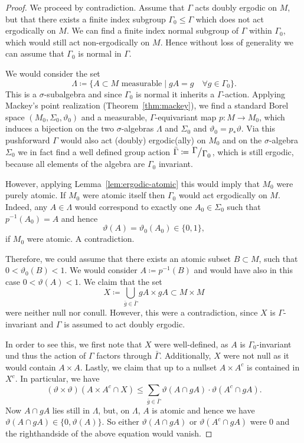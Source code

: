 \begin{proof}
  We proceed by contradiction. Assume that \(\Gamma\) acts doubly ergodic on \(M\), but that there exists a finite index subgroup \(\Gamma_0 \leq \Gamma\) which does not act ergodically on \(M\). We can find a finite index normal subgroup of \(\Gamma\) within \(\Gamma_0\), which would still act non-ergodically on \(M\). Hence without loss of generality we can assume that \(\Gamma_0\) is normal in \(\Gamma\).

  We would consider the set
  \[
    \Lambda \coloneqq \{A \subset M \text{ measurable} \mid gA = g \quad \forall g \in \Gamma_0\}.
  \]
  This is a \(\sigma\)-subalgebra and since \(\Gamma_0\) is normal it inherits a \(\Gamma\)-action. Applying Mackey's point realization (Theorem~\ref{thm:mackey}), we find a standard Borel space \((M_0, \Sigma_0, \vartheta_0)\) and a measurable, \(\Gamma\)-equivariant map \(p\colon M \to M_0\), which induces a bijection on the two \(\sigma\)-algebras \(\Lambda\) and \(\Sigma_0\) and \(\vartheta_0 = p_\ast \vartheta\). Via this pushforward \(\Gamma\) would also act (doubly) ergodic(ally) on \(M_0\) and on the \(\sigma\)-algebra \(\Sigma_0\) we in fact find a well defined group action \(\bar \Gamma \coloneqq \quot{\Gamma}{\Gamma_0}\), which is still ergodic, because all elements of the algebra are \(\Gamma_0\) invariant.

  However, applying Lemma~\ref{lem:ergodic-atomic} this would imply that \(M_0\) were purely atomic. If \(M_0\) were atomic itself then \(\Gamma_0\) would act ergodically on \(M\). Indeed, any \(A \in \Lambda\) would correspond  to exactly one \(A_0 \in \Sigma_0\) such that \(p^{-1}(A_0)= A\) and hence
  \[
    \vartheta(A) = \vartheta_0(A_0) \in \{0, 1\},
  \]
  if \(M_0\) were atomic. A contradiction.

  Therefore, we could assume that there exists an atomic subset \(B \subset M\), such that \(0 < \vartheta_0(B) < 1\). We would consider \(A \coloneqq p^{-1}(B)\) and would have also in this case \(0 < \vartheta(A) < 1\). We claim that the set
  \[
    X \coloneqq \bigcup_{\bar g \in \bar \Gamma}gA \times gA \subset M \times M
  \]
  were neither null nor conull. However, this were a contradiction, since \(X\) is \(\Gamma\)-invariant and \(\Gamma\) is assumed to act doubly ergodic.

  In order to see this, we first note that \(X\) were well-defined, as \(A\) is \(\Gamma_0\)-invariant und thus the action of \(\Gamma\) factors through \(\bar \Gamma\). Additionally, \(X\) were not null as it would contain \(A \times A\). Lastly, we claim that up to a nullset \(A \times A^c\) is contained in \(X^c\). In particular, we have
  \[
    (\vartheta\times\vartheta)(A \times A^c \cap X) \leq \sum_{\bar g \in \bar \Gamma} \vartheta(A \cap gA) \cdot \vartheta(A^c \cap gA).
  \]
  Now \(A \cap gA\) lies still in \(\Lambda\), but, on \(\Lambda\), \(A\) is atomic and hence we have \(\vartheta(A \cap gA) \in \{0, \vartheta(A)\}\). So either \(\vartheta(A \cap gA)\) or \(\vartheta(A^c \cap gA)\) were 0 and the righthandside of the above equation would vanish.
\end{proof}

